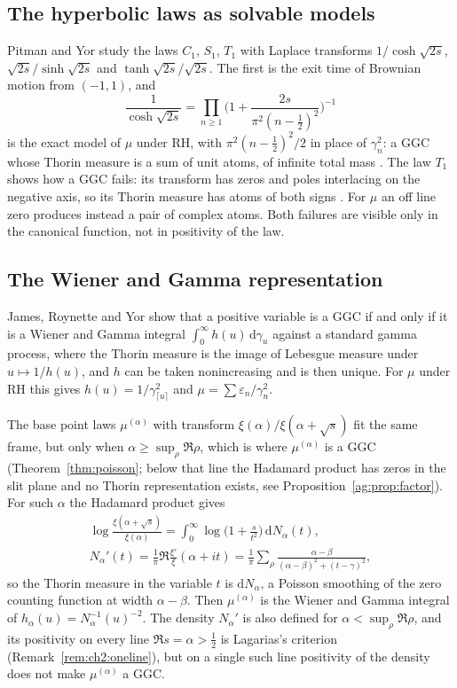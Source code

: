\subsection{The hyperbolic laws as solvable models}
Pitman and Yor \cite{PitmanYor03} study the laws $C_1$, $S_1$, $T_1$ with Laplace transforms $1/\cosh\sqrt{2s}$, $\sqrt{2s}/\sinh\sqrt{2s}$ and $\tanh\sqrt{2s}/\sqrt{2s}$. The first is the exit time of Brownian motion from $(-1,1)$, and
\[
\frac1{\cosh\sqrt{2s}}=\prod_{n\ge1}\Big(1+\frac{2s}{\pi^2(n-\frac12)^2}\Big)^{-1}
\]
is the exact model of $\mu$ under RH, with $\pi^2(n-\frac12)^2/2$ in place of $\gamma_n^2$: a GGC whose Thorin measure is a sum of unit atoms, of infinite total mass \cite[Section 1.6]{JRY}. %
The law $T_1$ shows how a GGC fails: its transform has zeros and poles interlacing on the negative axis, so its Thorin measure has atoms of both signs \cite{JRY}. For $\mu$ an off line zero produces instead a pair of complex atoms. Both failures are visible only in the canonical function, not in positivity of the law.

\subsection{The Wiener and Gamma representation}
James, Roynette and Yor \cite[Proposition 1.1]{JRY} %
show that a positive variable is a GGC if and only if it is a Wiener and Gamma integral $\int_0^\infty h(u)\,\mathrm d\gamma_u$ against a standard gamma process, where the Thorin measure is the image of Lebesgue measure under $u\mapsto1/h(u)$, and $h$ can be taken nonincreasing and is then unique. For $\mu$ under RH this gives $h(u)=1/\gamma_{\lceil u\rceil}^2$ and $\mu=\sum\varepsilon_n/\gamma_n^2$.

The base point laws $\mu^{(\alpha)}$ with transform $\xi(\alpha)/\xi(\alpha+\sqrt s)$ fit the same frame, but only when $\alpha\ge\sup_\rho\Re\rho$, which is where $\mu^{(\alpha)}$ is a GGC (Theorem~\ref{thm:poisson}; below that line the Hadamard product has zeros in the slit plane and no Thorin representation exists, see Proposition~\ref{ag:prop:factor}). For such $\alpha$ the Hadamard product gives
\begin{gather*}
\log\frac{\xi(\alpha+\sqrt s)}{\xi(\alpha)}=\int_0^\infty\log\Big(1+\frac s{t^2}\Big)\,\mathrm dN_\alpha(t),\\
N_\alpha'(t)=\frac1\pi\Re\frac{\xi'}{\xi}(\alpha+it)=\frac1\pi\sum_\rho\frac{\alpha-\beta}{(\alpha-\beta)^2+(t-\gamma)^2},
\end{gather*}
so the Thorin measure in the variable $t$ is $\mathrm dN_\alpha$, a Poisson smoothing of the zero counting function at width $\alpha-\beta$. Then $\mu^{(\alpha)}$ is the Wiener and Gamma integral of $h_\alpha(u)=N_\alpha^{-1}(u)^{-2}$. The density $N_\alpha'$ is also defined for $\alpha<\sup_\rho\Re\rho$, and its positivity on every line $\Re s=\alpha>\frac12$ is Lagarias's criterion (Remark~\ref{rem:ch2:oneline}), but on a single such line positivity of the density does not make $\mu^{(\alpha)}$ a GGC.

